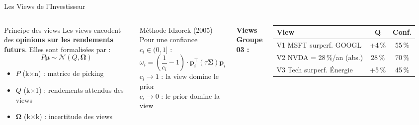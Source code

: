 \documentclass[aspectratio=169, 10pt, t]{beamer}
\newcommand{\Omegav}{\boldsymbol{\Omega}}
\begin{document}
\begin{frame}[t]{Les Views de l'Investisseur}
  \begin{columns}[c]
      \begin{block}{Principe des views}
        \small
        Les views encodent des \textbf{opinions sur les rendements futurs}.
        Elles sont formalisées par :
        \[
          P \boldsymbol{\mu} \sim \mathcal{N}(Q, \Omegav)
        \]
        \begin{itemize}
          \item $P$ (k×n) : matrice de picking
          \item $Q$ (k×1) : rendements attendus des views
          \item $\Omegav$ (k×k) : incertitude des views
        \end{itemize}
      \end{block}
      \vspace{0.3em}
      \begin{block}{Méthode Idzorek (2005)}
        \small
        Pour une confiance $c_i \in (0,1]$ :
        \[
          \omega_i = \left(\frac{1}{c_i} - 1\right) \cdot \mathbf{p}_i^\top (\tau \boldsymbol{\Sigma}) \mathbf{p}_i
        \]
        $c_i \to 1$ : la view domine le prior\\
        $c_i \to 0$ : le prior domine la view
      \end{block}
      \small
      \textbf{Views Groupe 03 :}\\[4pt]
      \begin{tabular}{@{}p{4.2cm}cc@{}}
        \toprule
        \textbf{View} & \textbf{Q} & \textbf{Conf.} \\
        \midrule
        \textcolor{AccentBlue}{V1} MSFT surperf. GOOGL & +4\,\% & 55\,\% \\
        \textcolor{SuccessGreen}{V2} NVDA = 28\,\%/an (abs.) & 28\,\% & 70\,\% \\
        \textcolor{WarnOrange}{V3} Tech surperf. Énergie & +5\,\% & 45\,\% \\
        \bottomrule
      \end{tabular}
      \vspace{0.5em}
\end{columns}
\end{frame}
\end{document}
